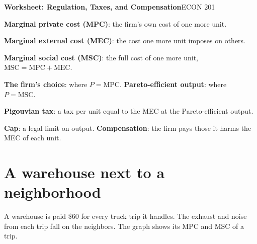 \documentclass[11pt]{article}
\begin{document}
{\LARGE\bfseries\color{accent} Worksheet: Regulation, Taxes, and Compensation}\hfill{\large ECON 201}

\newcommand{\term}[1]{\textcolor{accentdark}{\textbf{#1}}}

\newenvironment{deflist}
  {\begin{list}{\textbullet}{%
     \setlength{\leftmargin}{1.1em}\setlength{\labelwidth}{0.7em}%
     \setlength{\labelsep}{0.4em}\setlength{\itemindent}{0pt}%
     \setlength{\listparindent}{0pt}\setlength{\topsep}{2pt}%
     \setlength{\partopsep}{0pt}\setlength{\parsep}{0pt}%
     \setlength{\itemsep}{2pt}}}
  {\end{list}}

\begin{tcolorbox}[colback=cream, colframe=accent, boxrule=0.6pt, arc=2pt,
  left=6pt, right=6pt, top=4pt, bottom=4pt, title=Definitions,
  fonttitle=\bfseries, coltitle=white]
\begin{deflist}
\item \term{Marginal private cost (MPC)}: the firm's own cost of one more unit.
\item \term{Marginal external cost (MEC)}: the cost one more unit imposes on others.
\item \term{Marginal social cost (MSC)}: the full cost of one more unit,
  $\text{MSC} = \text{MPC} + \text{MEC}$.
\item \term{The firm's choice}: where $P = \text{MPC}$.
  \term{Pareto-efficient output}: where $P = \text{MSC}$.
\item \term{Pigouvian tax}: a tax per unit equal to the MEC at the Pareto-efficient output.
\item \term{Cap}: a legal limit on output.
  \term{Compensation}: the firm pays those it harms the MEC of each unit.
\end{deflist}
\end{tcolorbox}

\section{A warehouse next to a neighborhood}

A warehouse is paid \$60 for every truck trip it handles. The exhaust and
noise from each trip fall on the neighbors. The graph shows its MPC and MSC
of a trip.
\end{document}
